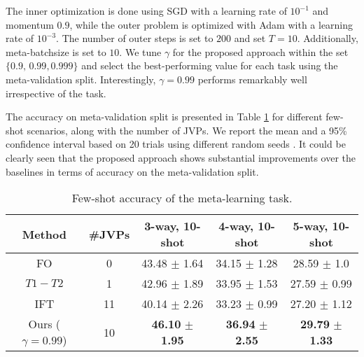 The inner optimization is done using SGD with a learning rate of $10^{-1}$ and momentum $0.9$, while the outer problem is optimized with Adam with a learning rate of $10^{-3}$. The number of outer steps is set to $200$ and set $T=10$. Additionally, meta-batchsize is set to $10$. We tune $\gamma$ for the proposed approach within the set $\{0.9, \, 0.99, 0.999\}$ and select the best-performing value for each task using the meta-validation split. Interestingly, $\gamma=0.99$ performs remarkably well irrespective of the task.

The accuracy on meta-validation split is presented in Table \ref{tab:meta_learn} for different few-shot scenarios, along with the number of JVPs.
We report the mean and a 95\% confidence interval based on 20 trials using different random seeds
. It could be clearly seen that the proposed approach shows substantial improvements over the baselines in terms of accuracy on the meta-validation split.


\begin{table}[]
    \centering
    \begin{tabular}{c|c|ccc}
    \toprule
    \textbf{Method} & \textbf{\#JVPs} & \textbf{3-way, 10-shot} & \textbf{4-way, 10-shot} & \textbf{5-way, 10-shot} \\ \midrule
    FO & 0 & 43.48 $\pm$ 1.64 & 34.15 $\pm$ 1.28 & 28.59 $\pm$ 1.0 \\
    $T1-T2$ & 1 & 42.96 $\pm$ 1.89 & 33.95 $\pm$ 1.53 & 27.59 $\pm$ 0.99 \\
    IFT & 11 & 40.14 $\pm$ 2.26 & 33.23 $\pm$ 0.99 & 27.20 $\pm$ 1.12 \\
    Ours ($\gamma = 0.99$) & 10 & \textbf{46.10} $\pm$ \textbf{1.95} & \textbf{36.94} $\pm$ \textbf{2.55} & \textbf{29.79} $\pm$ \textbf{1.33} \\ \bottomrule
    \end{tabular}
    \caption{Few-shot accuracy of the meta-learning task.}
    \label{tab:meta_learn}
\end{table}
